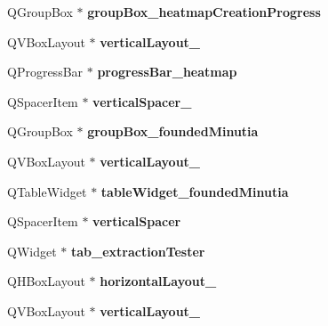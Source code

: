 \begin{DoxyCompactItemize}
Q\+Group\+Box $\ast$ {\bfseries group\+Box\+\_\+heatmap\+Creation\+Progress}
\item 
\mbox{\label{class_ui___main_window_a2e443acea8dcdda2848b1ab2daf3876e}} 
Q\+V\+Box\+Layout $\ast$ {\bfseries vertical\+Layout\+\_}
\item 
\mbox{\label{class_ui___main_window_ad68c66d5ec717de0cc93c259de6adaf3}} 
Q\+Progress\+Bar $\ast$ {\bfseries progress\+Bar\+\_\+heatmap}
\item 
\mbox{\label{class_ui___main_window_ac845bdf6b5b5237378a7b067808b7a31}} 
Q\+Spacer\+Item $\ast$ {\bfseries vertical\+Spacer\+\_}
\item 
\mbox{\label{class_ui___main_window_aecc1af737e9bdfc750199a2454b4f54f}} 
Q\+Group\+Box $\ast$ {\bfseries group\+Box\+\_\+founded\+Minutia}
\item 
\mbox{\label{class_ui___main_window_a8cf1c6ec21e85d25d8ff8cfc84652568}} 
Q\+V\+Box\+Layout $\ast$ {\bfseries vertical\+Layout\+\_}
\item 
\mbox{\label{class_ui___main_window_a80a7def429a894a880c3c60b040fa946}} 
Q\+Table\+Widget $\ast$ {\bfseries table\+Widget\+\_\+founded\+Minutia}
\item 
\mbox{\label{class_ui___main_window_a8384329c3663ff274e926a12024aab52}} 
Q\+Spacer\+Item $\ast$ {\bfseries vertical\+Spacer}
\item 
\mbox{\label{class_ui___main_window_a84822faf848f5288b8bdb25a9aee35a5}} 
Q\+Widget $\ast$ {\bfseries tab\+\_\+extraction\+Tester}
\item 
\mbox{\label{class_ui___main_window_a5fd1cd65b2895a627fd6c36e7a5b01e6}} 
Q\+H\+Box\+Layout $\ast$ {\bfseries horizontal\+Layout\+\_}
\item 
\mbox{\label{class_ui___main_window_a7b66d5d6ab55f3977317359d09a42345}} 
Q\+V\+Box\+Layout $\ast$ {\bfseries vertical\+Layout\+\_}
\item 

\end{DoxyCompactItemize}
